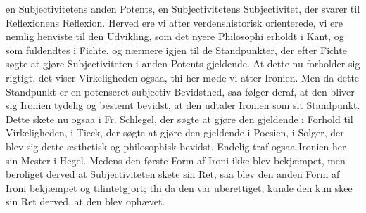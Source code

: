 \documentclass[12pt,a4paper]{article}
\begin{document}
en Subjectivitetens anden Potents, en Subjectivitetens Subjectivitet, der svarer til Reflexionens Reflexion. Herved ere vi atter verdenshistorisk orienterede, vi ere nemlig henviste til den Udvikling, som det nyere Philosophi erholdt i Kant, og som fuldendtes i Fichte, og nærmere igjen til de Standpunkter, der efter Fichte søgte at gjøre Subjectiviteten i anden Potents gjeldende. At dette nu forholder sig rigtigt, det viser Virkeligheden ogsaa, thi her møde vi atter Ironien. Men da dette Standpunkt er en potenseret subjectiv Bevidsthed, saa følger deraf, at den bliver sig Ironien tydelig og bestemt bevidst, at den udtaler Ironien som sit Standpunkt. Dette skete nu ogsaa i Fr. Schlegel, der søgte at gjøre den gjeldende i Forhold til Virkeligheden, i Tieck, der søgte at gjøre den gjeldende i Poesien, i Solger, der blev sig dette æsthetisk og philosophisk bevidst. Endelig traf ogsaa Ironien her sin Mester i Hegel. Medens den første Form af Ironi ikke blev bekjæmpet, men beroliget derved at Subjectiviteten skete sin Ret, saa blev den anden Form af Ironi bekjæmpet og tilintetgjort; thi da den var uberettiget, kunde den kun skee sin Ret derved, at den blev ophævet.
\end{document}
